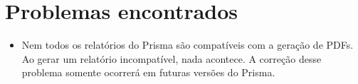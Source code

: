 \documentclass[12pt,a4paper]{article}
\begin{document}
\section{Problemas encontrados}
\begin{itemize}
  \item Nem todos os relatórios do Prisma são compatíveis com a geração de PDFs. Ao gerar um relatório incompatível, nada acontece. A correção desse problema somente ocorrerá em futuras versões do Prisma.
\end{itemize}
\end{document}
